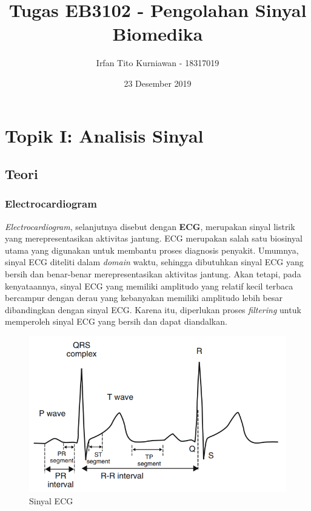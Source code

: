 \documentclass[11pt]{article}
\title{Tugas EB3102 - Pengolahan Sinyal Biomedika}
\author{Irfan Tito Kurniawan - 18317019}
\date{23 Desember 2019}
\begin{document}
\maketitle

\section{Topik I: Analisis Sinyal}\label{topik-i}
\subsection{Teori}
\subsubsection{Electrocardiogram}

\textit{Electrocardiogram}, selanjutnya disebut dengan \textbf{ECG}, merupakan sinyal listrik yang merepresentasikan aktivitas jantung. ECG merupakan salah satu biosinyal utama yang digunakan untuk membantu proses diagnosis penyakit. Umumnya, sinyal ECG diteliti dalam \textit{domain} waktu, sehingga dibutuhkan sinyal ECG yang bersih dan benar-benar merepresentasikan aktivitas jantung. Akan tetapi, pada kenyataannya, sinyal ECG yang memiliki amplitudo yang relatif kecil terbaca bercampur dengan derau yang kebanyakan memiliki amplitudo lebih besar dibandingkan dengan sinyal ECG. Karena itu, diperlukan proses \textit{filtering} untuk memperoleh sinyal ECG yang bersih dan dapat diandalkan.

\begin{figure}[H]
\centerline{\includegraphics[scale=0.35]{figures/fig2-ecgsegments.png}}
\caption{Sinyal ECG \cite{archarya14}}
\end{figure}
\end{document}
